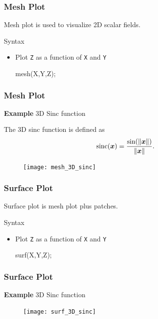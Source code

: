 \documentclass{beamer}  %
\begin{document}
\begin{frame}[fragile]
\frametitle{Mesh Plot}
Mesh plot is used to visualize 2D scalar fields.
\begin{block}{Syntax}
\begin{itemize}
    \item Plot \texttt{Z} as a function of \texttt{X} and \texttt{Y}
          \begin{matlabcodebeamer}[numbers=none,frame=none]
          mesh(X,Y,Z);
          \end{matlabcodebeamer}
\end{itemize}
\end{block}

\end{frame}
\begin{frame}[fragile]
\frametitle{Mesh Plot}
\textbf{Example} 3D Sinc function

The 3D sinc function is defined as
\begin{equation}
    \operatorname{sinc}(\boldsymbol{x}) = \frac{\sin(\| \boldsymbol{x} \|)}{\| \boldsymbol{x} \|}.
\end{equation}\pause

\setcounter{subfigure}{0}
\begin{figure}
    \centering
   \texttt{[image: mesh\_3D\_sinc]}
\end{figure}

\end{frame}
\begin{frame}[fragile]
\frametitle{Surface Plot}
Surface plot is mesh plot plus patches.
\begin{block}{Syntax}
\begin{itemize}
    \item Plot \texttt{Z} as a function of \texttt{X} and \texttt{Y}
          \begin{matlabcodebeamer}[numbers=none,frame=none]
          surf(X,Y,Z);
          \end{matlabcodebeamer}
\end{itemize}
\end{block}

\end{frame}
\begin{frame}[fragile]
\frametitle{Surface Plot}
\textbf{Example} 3D Sinc function

\setcounter{subfigure}{0}
\begin{figure}
    \centering
   \texttt{[image: surf\_3D\_sinc]}
\end{figure}

\end{frame}
\end{document}
